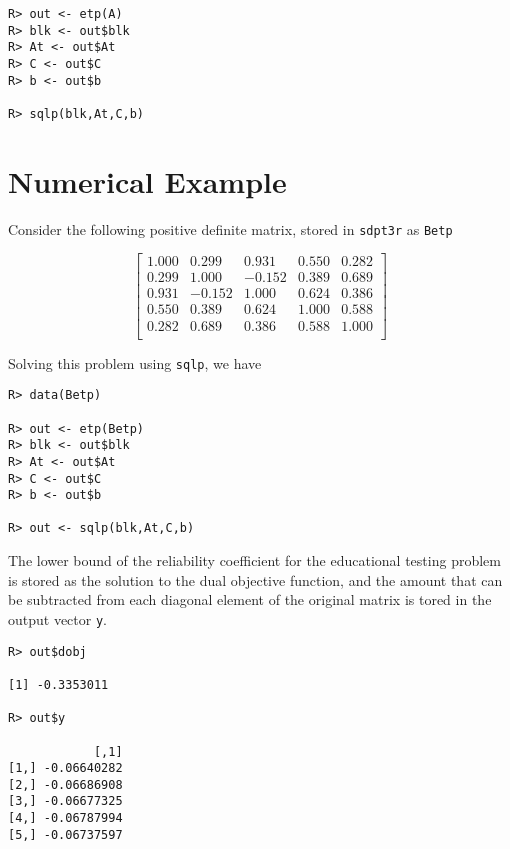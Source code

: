\documentclass{article}
\begin{document}
\begin{verbatim}
R> out <- etp(A)
R> blk <- out$blk
R> At <- out$At
R> C <- out$C
R> b <- out$b

R> sqlp(blk,At,C,b)
\end{verbatim}

\section*{Numerical Example}

Consider the following positive definite matrix, stored in \verb!sdpt3r! as \verb!Betp!

\[
\left[
\begin{array}{ccccc}
1.000 & 0.299 & 0.931 & 0.550 & 0.282 \\
0.299 & 1.000 & -0.152 & 0.389 & 0.689 \\
0.931 & -0.152 & 1.000 & 0.624 & 0.386 \\
0.550 & 0.389 & 0.624 & 1.000 & 0.588 \\
0.282 & 0.689 & 0.386 & 0.588 & 1.000 \\
\end{array} \right]
\]

Solving this problem using \verb!sqlp!, we have

\begin{verbatim}
R> data(Betp)

R> out <- etp(Betp)
R> blk <- out$blk
R> At <- out$At
R> C <- out$C
R> b <- out$b

R> out <- sqlp(blk,At,C,b)
\end{verbatim}

The lower bound of the reliability coefficient for the educational testing problem is stored as the solution to the dual objective function, and the amount that can be subtracted from each diagonal element of the original matrix is tored in the output vector \verb!y!.

\begin{verbatim}
R> out$dobj

[1] -0.3353011

R> out$y

            [,1]
[1,] -0.06640282
[2,] -0.06686908
[3,] -0.06677325
[4,] -0.06787994
[5,] -0.06737597
\end{verbatim}



\end{document}
